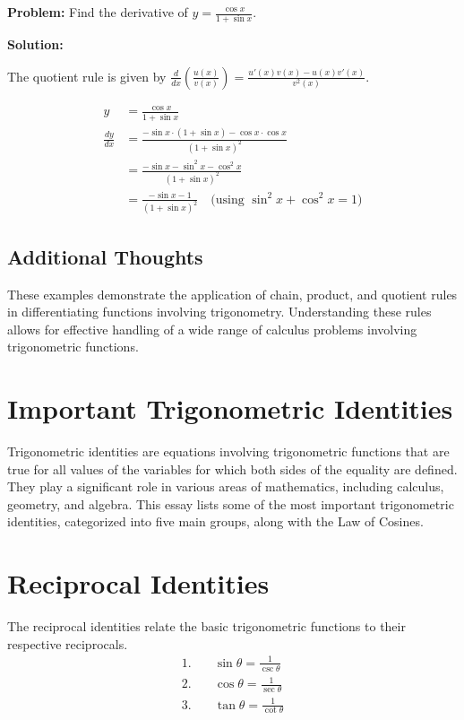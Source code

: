 \documentclass[a4paper,12pt]{book}
\newcounter{problem}
\newcounter{example}
\begin{document}
\textbf{Problem:} Find the derivative of \( y = \frac{\cos x}{1 + \sin x} \).

\textbf{Solution:}

The quotient rule is given by \(\frac{d}{dx} \left(\frac{u(x)}{v(x)}\right) = \frac{u'(x)v(x) - u(x)v'(x)}{v^2(x)}\).

\begin{align*}
y &= \frac{\cos x}{1 + \sin x} \\
\frac{dy}{dx} &= \frac{-\sin x \cdot (1 + \sin x) - \cos x \cdot \cos x}{(1 + \sin x)^2} \\
              &= \frac{-\sin x - \sin^2 x - \cos^2 x}{(1 + \sin x)^2} \\
              &= \frac{-\sin x - 1}{(1 + \sin x)^2} \quad \text{(using } \sin^2 x + \cos^2 x = 1\text{)}
\end{align*}

\subsection*{Additional Thoughts}

These examples demonstrate the application of chain, product, and quotient rules in differentiating functions involving trigonometry. Understanding these rules allows for effective handling of a wide range of calculus problems involving trigonometric functions.



\section{Important Trigonometric Identities}
Trigonometric identities are equations involving trigonometric functions that are true for all values of the variables for which both sides of the equality are defined. They play a significant role in various areas of mathematics, including calculus, geometry, and algebra. This essay lists some of the most important trigonometric identities, categorized into five main groups, along with the Law of Cosines.

\section*{Reciprocal Identities}
The reciprocal identities relate the basic trigonometric functions to their respective reciprocals.
\begin{align}
    1. \quad & \sin \theta = \frac{1}{\csc \theta} \\
    2. \quad & \cos \theta = \frac{1}{\sec \theta} \\
    3. \quad & \tan \theta = \frac{1}{\cot \theta}
\end{align}
\end{document}

